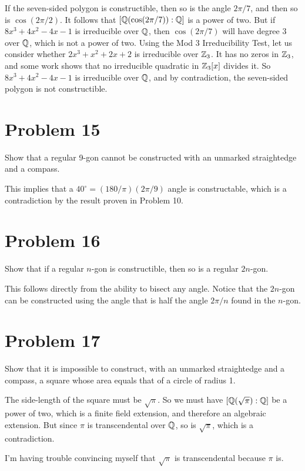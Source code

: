 \documentclass{article}
\begin{document}
If the seven-sided polygon is constructible, then so is the angle $2\pi/7$, and then
so is $\cos(2\pi/2)$.  It follows that $[\mathbb{Q}(\cos(2\pi/7)):\mathbb{Q}]$ is a power of two.
But if $8x^3+4x^2-4x-1$ is irreducible over $\mathbb{Q}$, then $\cos(2\pi/7)$ will have
degree 3 over $\mathbb{Q}$, which is not a power of two.
Using the Mod 3 Irreducibility Test, let us consider whether $2x^3+x^2+2x+2$ is
irreducible over $\mathbb{Z}_3$.  It has no zeros in $\mathbb{Z}_3$, and some work shows that no
irreducible quadratic in $\mathbb{Z}_3[x]$ divides it.  So $8x^3+4x^2-4x-1$ is irreducible
over $\mathbb{Q}$, and by contradiction, the seven-sided polygon is not constructible.

\section*{Problem 15}

Show that a regular 9-gon cannot be constructed with an unmarked straightedge and a compass.

This implies that a $40^{\circ}=(180/\pi)(2\pi/9)$ angle is constructable, which is a contradiction
by the result proven in Problem 10.

\section*{Problem 16}

Show that if a regular $n$-gon is constructible, then so is a regular $2n$-gon.

This follows directly from the ability to bisect any angle.  Notice that the $2n$-gon
can be constructed using the angle that is half the angle $2\pi/n$ found in the $n$-gon.

\section*{Problem 17}

Show that it is impossible to construct, with an unmarked straightedge and a compass, a square
whose area equals that of a circle of radius 1.

The side-length of the square must be $\sqrt{\pi}$.
So we must have $[\mathbb{Q}(\sqrt{\pi}):\mathbb{Q}]$ be a power of two, which is a finite field extension,
and therefore an algebraic extension.
But since $\pi$ is transcendental over $\mathbb{Q}$, so is $\sqrt{\pi}$,
which is a contradiction.

I'm having trouble convincing myself that $\sqrt{\pi}$ is transcendental because $\pi$ is.
\end{document}
